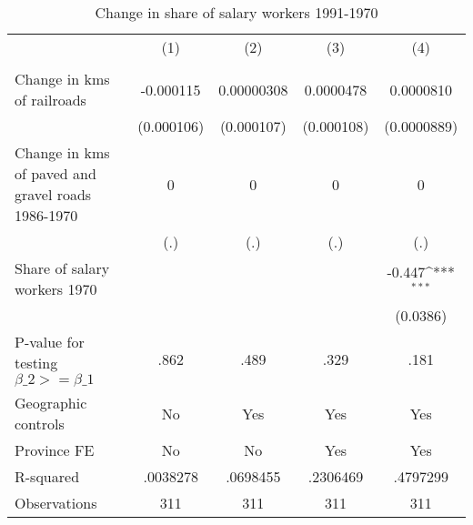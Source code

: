 \begin{table}[htbp]\centering
\def\sym#1{\ifmmode^{#1}\else\(^{#1}\)\fi}
\caption{Change in share of salary workers 1991-1970}
\begin{tabular}{l*{4}{c}}
\hline\hline
                &\multicolumn{1}{c}{(1)}&\multicolumn{1}{c}{(2)}&\multicolumn{1}{c}{(3)}&\multicolumn{1}{c}{(4)}\\
                &\multicolumn{1}{c}{}&\multicolumn{1}{c}{}&\multicolumn{1}{c}{}&\multicolumn{1}{c}{}\\
\hline
Change in kms of railroads&-0.000115         &0.00000308         &0.0000478         &0.0000810         \\
                &(0.000106)         &(0.000107)         &(0.000108)         &(0.0000889)         \\
[1em]
Change in kms of paved and gravel roads 1986-1970&        0         &        0         &        0         &        0         \\
                &      (.)         &      (.)         &      (.)         &      (.)         \\
[1em]
Share of salary workers 1970&                  &                  &                  &   -0.447\sym{***}\\
                &                  &                  &                  & (0.0386)         \\
\hline
P-value for testing $\beta\_{2} >= \beta\_{1}$&     .862         &     .489         &     .329         &     .181         \\
Geographic controls&       No         &      Yes         &      Yes         &      Yes         \\
Province FE     &       No         &       No         &      Yes         &      Yes         \\
R-squared       & .0038278         & .0698455         & .2306469         & .4797299         \\
Observations    &      311         &      311         &      311         &      311         \\
\hline\hline
\end{tabular}
\end{table}
